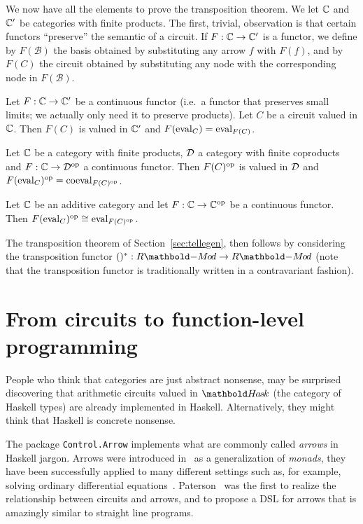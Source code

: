 We now have all the elements to prove the transposition theorem. We
let $\mathbb{C}$ and $\mathbb{C}'$ be categories with finite products.  The first,
trivial, observation is that certain functors ``preserve'' the
semantic of a circuit. If $F:\mathbb{C}\rightarrow\mathbb{C}'$ is a functor, we define by
$F(\mathcal{B})$ the basis obtained by substituting any arrow $f$ with
$F(f)$, and by $F(C)$ the circuit obtained by substituting any node
with the corresponding node in $F(\mathcal{B})$.

\begin{proposition}
  Let $F:\mathbb{C}\rightarrow\mathbb{C}'$ be a continuous functor (i.e.\ a functor that
  preserves small limits; we actually only need it to preserve
  products). Let $C$ be a circuit valued in $\mathbb{C}$. Then $F(C)$ is
  valued in $\mathbb{C}'$ and $F(\operatorname{eval}_C)=\operatorname{eval}_{F(C)}$.
\end{proposition}

\begin{corollary}
  Let $\mathbb{C}$ be a category with finite products, $\mathcal{D}$ a category with
  finite coproducts and $F:\mathbb{C}\rightarrow\mathcal{D}^{\mathrm{op}}$ a continuous functor. Then
  $F(C)^{\mathrm{op}}$ is valued in $\mathcal{D}$ and $F(\operatorname{eval}_C)^{\mathrm{op}}=\operatorname{coeval}_{F(C)^{\mathrm{op}}}$.
\end{corollary}

\begin{corollary}
  Let $\mathbb{C}$ be an additive category and let $F:\mathbb{C}\rightarrow\mathbb{C}^{\mathrm{op}}$ be a
  continuous functor. Then $F(\operatorname{eval}_{C})^{\mathrm{op}}\cong\operatorname{eval}_{F(C)^{\mathrm{op}}}$.
\end{corollary}

The transposition theorem of Section~\ref{sec:tellegen}, then follows
by considering the transposition functor
$\dual{()}:\RMod{R}\ra\RMod{R}$ (note that the transposition
functor is traditionally written in a contravariant fashion).


\section{From circuits to function-level programming}
\label{sec:fp}
\lstset{language=haskell} People who think that categories are just
abstract nonsense, may be surprised discovering that arithmetic
circuits valued in $\Hask$ (the category of Haskell types) are
already implemented in Haskell. Alternatively, they might think that
Haskell is concrete nonsense.

The package \lstinline+Control.Arrow+ implements what are commonly
called \emph{arrows} in Haskell jargon. Arrows were introduced
in~\cite{hughes98} as a generalization of \emph{monads}, they have
been successfully applied to many different settings such as, for
example, solving ordinary differential
equations~\cite{liu+hudak10}. Paterson~\cite{paterson01} was the first
to realize the relationship between circuits and arrows, and to
propose a DSL for arrows that is amazingly similar to straight line
programs.

